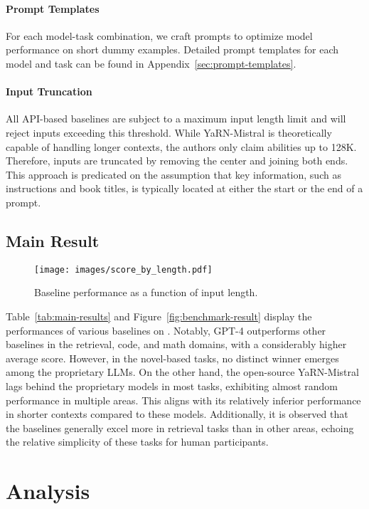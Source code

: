 \paragraph{Prompt Templates}

For each model-task combination, we craft prompts to optimize model performance on short dummy examples. Detailed prompt templates for each model and task can be found in Appendix~\ref{sec:prompt-templates}.

\paragraph{Input Truncation}
All API-based baselines are subject to a maximum input length limit and will reject inputs exceeding this threshold. While YaRN-Mistral is theoretically capable of handling longer contexts, the authors only claim abilities up to 128K. Therefore, inputs are truncated by removing the center and joining both ends. This approach is predicated on the assumption that key information, such as instructions and book titles, is typically located at either the start or the end of a prompt.

\subsection{Main Result}
\begin{figure*}[!ht]
    \centering
    \texttt{[image: images/score\_by\_length.pdf]}
    \caption{Baseline performance as a function of input length.}
    \label{fig:score-by-length}
\end{figure*}

Table~\ref{tab:main-results} and Figure~\ref{fig:benchmark-result} display the performances of various baselines on \OURS. Notably, GPT-4 outperforms other baselines in the retrieval, code, and math domains, with a considerably higher average score. However, in the novel-based tasks, no distinct winner emerges among the proprietary LLMs. On the other hand, the open-source YaRN-Mistral lags behind the proprietary models in most tasks, exhibiting almost random performance in multiple areas. This aligns with its relatively inferior performance in shorter contexts compared to these models. Additionally, it is observed that the baselines generally excel more in retrieval tasks than in other areas, echoing the relative simplicity of these tasks for human participants.
\section{Analysis}

